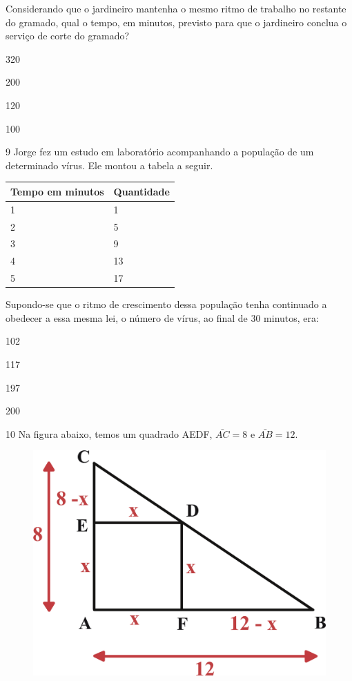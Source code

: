 \pagebreak
Considerando que o jardineiro mantenha o mesmo ritmo de trabalho no
restante do gramado, qual o tempo, em minutos, previsto para que o
jardineiro conclua o serviço de corte do gramado?

\begin{escolha}

  \item 320

  \item 200

  \item 120

  \item 100

\end{escolha}

\num{9} Jorge fez um estudo em laboratório acompanhando a população de um
determinado vírus. Ele montou a tabela a seguir.

\begin{longtable}[]{@{}ll@{}}
\toprule
Tempo em minutos & Quantidade\tabularnewline
\midrule
\endhead
1 & 1\tabularnewline
2 & 5\tabularnewline
3 & 9\tabularnewline
4 & 13\tabularnewline
5 & 17\tabularnewline
\bottomrule
\end{longtable}

Supondo-se que o ritmo de crescimento dessa população tenha continuado a
obedecer a essa mesma lei, o número de vírus, ao final de 30 minutos,
era:

\begin{escolha}

  \item 102

  \item 117

  \item 197

  \item 200

\end{escolha}

\pagebreak
\num{10} Na figura abaixo, temos um quadrado AEDF, $\bar{AC} = 8$ e $\bar{AB} = 12$.

\begin{figure}[htpb!]
\centering
\includegraphics[width=.5\textwidth]{./ilustras-mat/Simulado_3-atividade_10_resposta.png}
\end{figure}

